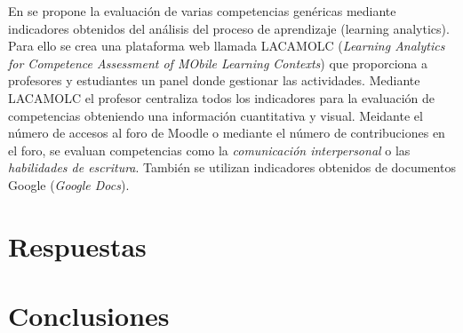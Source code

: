 En \cite{rayon2014web} se propone la evaluación de varias competencias genéricas mediante indicadores obtenidos del análisis del proceso de aprendizaje (learning analytics). Para ello se crea una plataforma web llamada LACAMOLC (\emph{Learning Analytics for Competence Assessment of MObile Learning Contexts}) que proporciona a profesores y estudiantes un panel donde gestionar las actividades. Mediante LACAMOLC el profesor centraliza todos los indicadores para la evaluación de competencias obteniendo una información cuantitativa y visual. Meidante el número de accesos al foro de Moodle o mediante el número de contribuciones en el foro, se evaluan competencias como la \emph{comunicación interpersonal} o las \emph{habilidades de escritura}. También se utilizan indicadores obtenidos de documentos Google (\emph{Google Docs}).

\section{Respuestas}



\section{Conclusiones}

